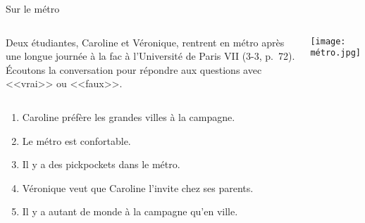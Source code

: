 \begin{frame}{Sur le métro}
  \begin{columns}
      Deux étudiantes, Caroline et Véronique, rentrent en métro après une longue journée à la fac à l'Université de Paris VII (3-3, p.~72).
      Écoutons la conversation pour répondre aux questions avec <<vrai>> ou <<faux>>.
      \begin{center}
        \texttt{[image: métro.jpg]}
      \end{center}
  \end{columns}
  \vspace{0.25cm}
  \begin{enumerate}
    \item Caroline préfère les grandes villes à la campagne.\hfill\underline{}
    \item Le métro est confortable.\hfill\underline{}
    \item Il y a des pickpockets dans le métro.\hfill\underline{}
    \item Véronique veut que Caroline l'invite chez ses parents.\hfill\underline{}
    \item Il y a autant de monde à la campagne qu'en ville.\hfill\underline{}
  \end{enumerate}
\end{frame}